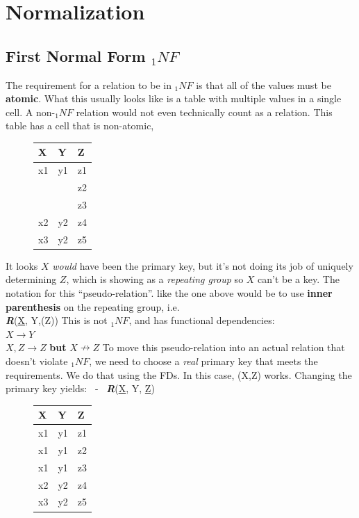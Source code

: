 \documentclass{report}
\begin{document}
\section{Normalization}
\subsection{First Normal Form $_1NF$}
The requirement for a relation to be in $_1NF$ is that all of the values must be \textbf{atomic}.
\bigbreak \noindent
What this usually looks like is a table with multiple values in a single cell. A non-$_1NF$ relation would not even technically count as a relation. This table has a cell that is non-atomic,
    \begin{figure}[ht]
    \centering
     \setlength{\tabcolsep}{45}
    \begin{tabular}{l l l}
        \hline
    X&Y&Z \\ 
\hline
    x1&y1&z1 \\
      &&z2 \\
      && z3 \\
    x2&y2&z4\\
    x3&y2&z5 \\
    \hline
    \end{tabular}
    \end{figure}
    \bigbreak \noindent
    It looks $X$ \textit{would} have been the primary key, but it's not doing its job of uniquely determining $Z$, which is showing as a \textit{repeating group} so $X$ can't be a key.
    \bigbreak \noindent
    The notation for this ``pseudo-relation''. like the one above would be to use \textbf{inner parenthesis} on the repeating group, i.e. \vspace{2mm} \\
    \textit{\textbf{R}}(\underline{X}, Y,(Z))
    \bigbreak \noindent
This is not $_1NF$, and has functional dependencies:  \\
$ X \rightarrow Y$ \\
$ X,Z \rightarrow Z$ \textbf{but} $X\nrightarrow Z$
\bigbreak \noindent
To move this pseudo-relation into an actual relation that doesn't violate $_1NF$, we need to choose a \textit{real} primary key that meets the requirements. We do that using the FDs. In this case, (X,Z) works.
\bigbreak \noindent
Changing the primary key yields: \ - \ \textit{\textbf{R}}(\underline{X}, Y, \underline{Z})
    \begin{figure}[H]
    \centering
     \setlength{\tabcolsep}{45}
    \begin{tabular}{l l l}
        \hline
    X&Y&Z \\ 
\hline
    x1&y1&z1 \\
    x1&y1&z2 \\
      x1&y1& z3 \\
    x2&y2&z4\\
    x3&y2&z5 \\
    \hline
    \end{tabular}
    \end{figure}
\end{document}
